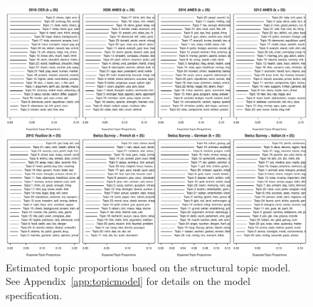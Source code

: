 \begin{figure}[h]\centering
\includegraphics[width=.89\textwidth]{../fig/stm_prop.pdf}
\caption[Estimated topic proportions based on the structural topic model]{Estimated topic proportions based on the structural topic model. See Appendix~\ref{app:topicmodel} for details on the model specification.}\label{fig:stm_prop}
\end{figure}


\clearpage
